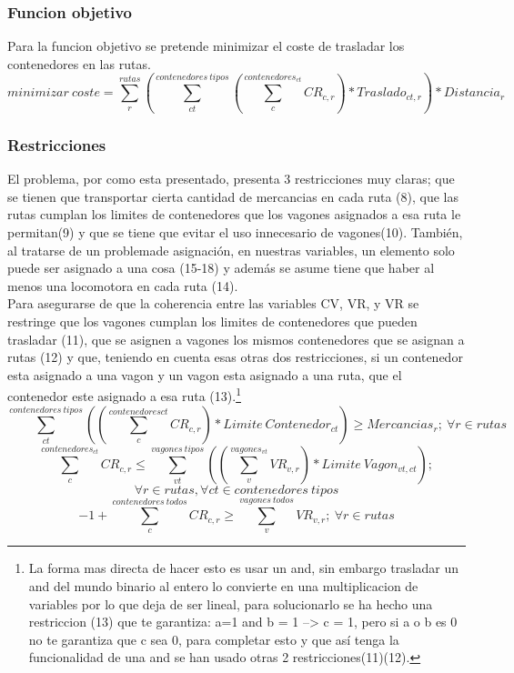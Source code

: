 \documentclass[11pt,spanish]{article}
\begin{document}
			\subsubsection{Funcion objetivo}
			Para la funcion objetivo se pretende minimizar el coste de trasladar los contenedores en las rutas.
			$$
			minimizar\ coste = \sum_r^{rutas} \left( \sum_{ct}^{contenedores\ tipos} \left( \sum_c^{contenedores_{ct}} CR_{c,r} \right) * Traslado_{ct,r} \right) * Distancia_r
			$$
			\subsubsection{Restricciones}
			El problema, por como esta presentado, presenta 3 restricciones muy claras; que se tienen que transportar cierta cantidad de mercancias en cada ruta (8), que las rutas cumplan los limites de contenedores que los vagones asignados a esa ruta le permitan(9) y que se tiene que evitar el uso innecesario de vagones(10). También, al tratarse de un problemade asignación, en nuestras variables, un elemento solo puede ser asignado a una cosa (15-18) y además se asume tiene que haber al menos una locomotora en cada ruta (14).\\
			Para asegurarse de que la coherencia entre las variables CV, VR, y VR se restringe que los vagones cumplan los limites de contenedores que pueden trasladar (11), que se asignen a vagones los mismos contenedores que se asignan a rutas (12) y que, teniendo en cuenta esas otras dos restricciones, si un contenedor esta asignado a una vagon y un vagon esta asignado a una ruta, que el contenedor este asignado a esa ruta (13).\footnote{La forma mas directa de hacer esto es usar un and, sin embargo trasladar un and del mundo binario al entero lo convierte en una multiplicacion de variables por lo que deja de ser lineal, para solucionarlo se ha hecho una restriccion (13) que te garantiza: a=1 and b = 1 --> c = 1, pero si a o b es 0 no te garantiza que c sea 0, para completar esto y que así tenga la funcionalidad de una and se han usado otras 2 restricciones(11)(12).}
			\begin{equation}
				\sum_{ct}^{contenedores\ tipos}\left(\left( \sum_c^{contenedores{ct}} CR_{c,r} \right) * Limite\ Contenedor_{ct} \right) \geq  Mercancias_r;\ \forall r \in rutas
			\end{equation}
			\begin{equation}
				\sum_c^{contenedores_{ct}} CR_{c,r} \leq \sum_{vt}^{vagones\ tipos} \left( \left(\sum_v^{vagones_{vt}}VR_{v,r}\right)*Limite\ Vagon_{vt,ct} \right);
			\end{equation}
			$$\forall r \in rutas,\forall ct \in contenedores\ tipos$$
			\begin{equation}
				-1+\sum_c^{contenedores\ todos} CR_{c,r} \geq \sum_v^{vagones\ todos} VR_{v,r};\ \forall r \in rutas
			\end{equation}
\end{document}
